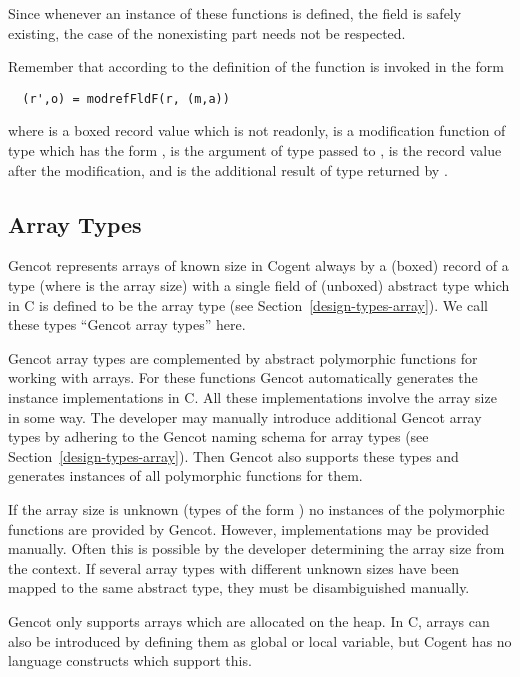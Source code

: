 Since whenever an instance of these functions is defined, the field is safely existing, the case of the nonexisting
part needs not be respected.

Remember that according to the definition of 
 the function  is invoked in the form
\begin{verbatim}
  (r',o) = modrefFldF(r, (m,a))
\end{verbatim}
where  is a boxed record value which is not readonly,  is a modification function of type  which
has the form ,  is the argument of type  passed to ,  is
the record value  after the modification, and  is the additional result of type  returned by .

\subsection{Array Types}
\label{design-operations-array}

Gencot represents arrays of known size in Cogent always by a (boxed) record of a type  (where  is the array size)
with a single field of (unboxed) abstract type  which in C is defined to be the array type (see Section~\ref{design-types-array}).
We call these types ``Gencot array types'' here.

Gencot array types are complemented by abstract polymorphic functions for working with
arrays. For these functions Gencot automatically generates the instance 
implementations in C. All these implementations involve the array size in some way. The developer may manually introduce
additional Gencot array types by adhering to the Gencot naming schema for array types (see Section~\ref{design-types-array}). 
Then Gencot also supports these types and generates instances of all polymorphic functions for them.

If the array size is unknown (types of the form )
no instances of the polymorphic functions are provided by Gencot. However, implementations may be provided manually. Often
this is possible by the developer determining the array size from the context. If several array types with 
different unknown sizes have been mapped to the same abstract type, they must be disambiguished manually.

Gencot only supports arrays which are allocated on the heap. In C, arrays can also be introduced by defining
them as global or local variable, but Cogent has no language constructs which support this.

